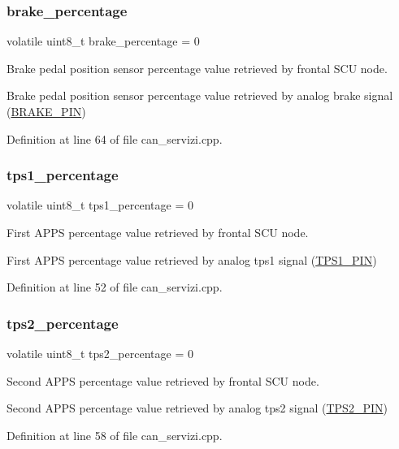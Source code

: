 \subsubsection{\texorpdfstring{brake\+\_\+percentage}{brake\_percentage}}
{\footnotesize\ttfamily volatile uint8\+\_\+t brake\+\_\+percentage = 0}



Brake pedal position sensor percentage value retrieved by frontal S\+CU node. 

Brake pedal position sensor percentage value retrieved by analog brake signal (\mbox{\hyperlink{group___board__model__group_gad632b56bf4c6259a390c3db91607078e}{B\+R\+A\+K\+E\+\_\+\+P\+IN}}) 

Definition at line 64 of file can\+\_\+servizi.\+cpp.

\mbox{\label{group___c_a_n__servizi__group_ga1d42f28ccf027a3243fad064fa47ef81}} 
\subsubsection{\texorpdfstring{tps1\+\_\+percentage}{tps1\_percentage}}
{\footnotesize\ttfamily volatile uint8\+\_\+t tps1\+\_\+percentage = 0}



First A\+P\+PS percentage value retrieved by frontal S\+CU node. 

First A\+P\+PS percentage value retrieved by analog tps1 signal (\mbox{\hyperlink{group___board__model__group_gae9aa914854f611488701c96a330b0bd4}{T\+P\+S1\+\_\+\+P\+IN}}) 

Definition at line 52 of file can\+\_\+servizi.\+cpp.

\mbox{\label{group___c_a_n__servizi__group_gaf69d82f83885abc5adbd5fcbf4c421cf}} 
\subsubsection{\texorpdfstring{tps2\+\_\+percentage}{tps2\_percentage}}
{\footnotesize\ttfamily volatile uint8\+\_\+t tps2\+\_\+percentage = 0}



Second A\+P\+PS percentage value retrieved by frontal S\+CU node. 

Second A\+P\+PS percentage value retrieved by analog tps2 signal (\mbox{\hyperlink{group___board__model__group_gab13a816bae3ca994897fc6f1cb590a67}{T\+P\+S2\+\_\+\+P\+IN}}) 

Definition at line 58 of file can\+\_\+servizi.\+cpp.

